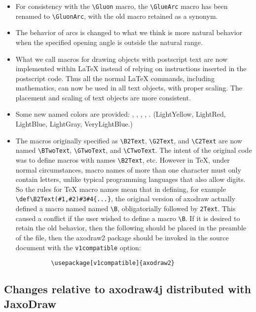 \documentclass[12pt]{article}
\begin{document}
\begin{itemize}
\item For consistency with the \verb+\Gluon+ macro, the
  \verb+\GlueArc+ macro has been renamed to \verb+\GluonArc+, with the old
  macro retained as a synonym.

\item The behavior of arcs is changed to what we think is more natural
  behavior when the specified opening angle is outside the natural range.

\item What we call macros for drawing objects with postscript text are
  now implemented within \LaTeX{} instead of relying on instructions
  inserted in the postscript code.  Thus all the normal \LaTeX{}
  commands, including mathematics, can now be used in all text
  objects, with proper scaling.  The placement and scaling of text
  objects are more consistent. 

\item Some new named colors are provided:
  , ,
  , ,
  .  
  (LightYellow, LightRed, LightBlue, LightGray, VeryLightBlue.)

\item The macros originally specified as \verb+\B2Text+,
  \verb+\G2Text+, and \verb+\C2Text+ are now named \verb+\BTwoText+,
  \verb+\GTwoText+, and \verb+\CTwoText+.  The intent of the original
  code was to define macros with names \verb+\B2Text+, etc.  However
  in \TeX, under normal circumstances, macro names of more than one
  character must only contain letters, unlike typical programming
  languages that also allow digits.  So the rules for \TeX{} macro
  names mean that in defining, for example
  \verb+\def\B2Text(#1,#2)#3#4{...}+, the original version of axodraw
  actually defined a macro named named \verb+\B+, obligatorially
  followed by \verb+2Text+.  This caused a conflict if the user wished
  to define a macro \verb+\B+.  If it is desired to retain the old
  behavior, then the following should be placed in the preamble of the
   file, then the axodraw2 package should be invoked in the
  source document with the \texttt{v1compatible} option:
    \begin{verbatim}
          \usepackage[v1compatible]{axodraw2}
    \end{verbatim}

\end{itemize}

\subsection{Changes relative to axodraw4j distributed with JaxoDraw}
\label{sec:changes.wrt.4j}
\end{document}
